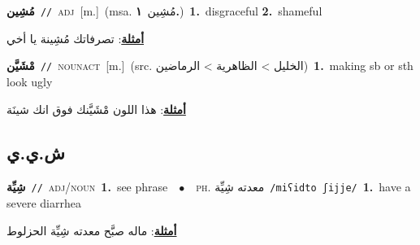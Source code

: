\documentclass[10pt,a4paper,twoside]{article} %
\begin{document}
\begin{multicols}{2}
{\setlength\topsep{0pt}\textbf{\foreignlanguage{arabic}{مُشِين}}\ {\color{gray}\texttt{//}\color{black}}\ \textsc{adj}\ [m.]\ \color{gray}(msa. \foreignlanguage{arabic}{مُشِين}~\foreignlanguage{arabic}{\textbf{١.}})\color{black}\ \textbf{1.}~disgraceful  \textbf{2.}~shameful\  \begin{flushright}\color{gray}\foreignlanguage{arabic}{\textbf{\underline{\foreignlanguage{arabic}{أمثلة}}}: تصرفاتك مُشِينة يا أخي}\end{flushright}\color{black}} \vspace{2mm}

{\setlength\topsep{0pt}\textbf{\foreignlanguage{arabic}{مْشَيَّن}}\ {\color{gray}\texttt{//}\color{black}}\ \textsc{noun\textunderscore act}\ [m.]\ (src. \color{gray}\foreignlanguage{arabic}{الخليل > الظاهرية > الرماضين}\color{black})\ \textbf{1.}~making sb or sth look ugly\  \begin{flushright}\color{gray}\foreignlanguage{arabic}{\textbf{\underline{\foreignlanguage{arabic}{أمثلة}}}: هذا اللون مْشَيَّنك فوق انك شينَة}\end{flushright}\color{black}} \vspace{2mm}

\vspace{-3mm}
\subsection*{\color{blue}\foreignlanguage{arabic}{ش.ي.ي}\color{blue}{}} 

{\setlength\topsep{0pt}\textbf{\foreignlanguage{arabic}{شِيِّة}}\ {\color{gray}\texttt{//}\color{black}}\ \textsc{adj/noun}\ \textbf{1.}~see phrase\ \ $\bullet$\ \ \textsc{ph.} \color{gray} \foreignlanguage{arabic}{معدته شِيِّة}\color{black}\ {\color{gray}\texttt{/{\sffamily miʕidto ʃijje}/}\color{black}}\ \textbf{1.}~have a severe diarrhea\  \begin{flushright}\color{gray}\foreignlanguage{arabic}{\textbf{\underline{\foreignlanguage{arabic}{أمثلة}}}: ماله صبَّح  معدته شِيِّة الحزلوط}\end{flushright}\color{black}} \vspace{2mm}

\end{multicols}
\end{document}
